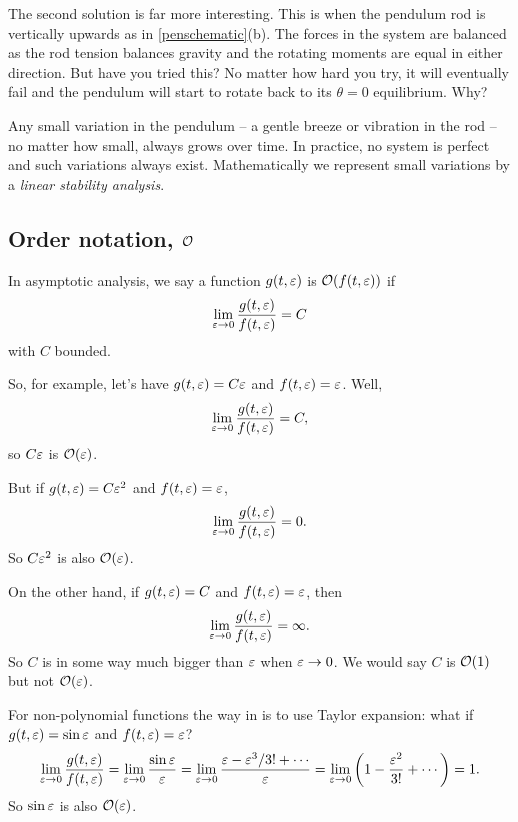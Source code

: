 \documentclass[main.tex]{subfiles}
\begin{document}
The second solution is far more interesting. This is when the pendulum rod is vertically upwards as in \cref{penschematic}(b). The forces in the system are balanced as the rod tension balances gravity and the rotating moments are equal in either direction. But have you tried this? No matter how hard you try, it will eventually fail and the pendulum will start to rotate back to its $\theta=0$ equilibrium. Why? 

Any small variation in the pendulum -- a gentle breeze or vibration in the rod -- no matter how small, always grows over time. In practice, no system is perfect and such variations always exist. Mathematically we represent small variations by a \emph{linear stability analysis}.

\subsection{Order notation, \texorpdfstring{$\mathcal{O}$}{O}}
In asymptotic analysis, we say a function $g(t,\varepsilon)$ is $\mathcal{O}(f(t,\varepsilon))$ if 
\begin{equation}
\lim_{\varepsilon\to 0} \frac{g(t,\varepsilon)}{f(t,\varepsilon)} = C
\end{equation}
with $C$ bounded. 

So, for example, let's have $g(t,\varepsilon) = C \varepsilon$ and $f(t,\varepsilon)  = \varepsilon$. Well,
\begin{equation}
\lim_{\varepsilon\to 0} \frac{g(t,\varepsilon)}{f(t,\varepsilon)} = C,
\end{equation}
so $ C \varepsilon$ is $\mathcal{O}(\varepsilon)$. 

But if $g(t,\varepsilon) = C \varepsilon^2$ and $f(t,\varepsilon)  = \varepsilon$,
\begin{equation}
\lim_{\varepsilon\to 0} \frac{g(t,\varepsilon)}{f(t,\varepsilon)} = 0.
\end{equation}
So $C \varepsilon^2$ is also $\mathcal{O}(\varepsilon)$.

On the other hand, if $g(t,\varepsilon) = C$ and $f(t,\varepsilon)  = \varepsilon$, then
\begin{equation}
\lim_{\varepsilon\to 0} \frac{g(t,\varepsilon)}{f(t,\varepsilon)} = \infty.
\end{equation}
So $C$ is in some way much bigger than $\varepsilon$ when $\varepsilon\to 0$. We would say $C$ is $\mathcal{O}(1)$ but not $\mathcal{O}(\varepsilon)$. 

For non-polynomial functions the way in is to use Taylor expansion: what if $g(t,\varepsilon) = \sin\varepsilon$ and $f(t,\varepsilon) = \varepsilon$?
\begin{equation}
\lim_{\varepsilon\to 0} \frac{g(t,\varepsilon)}{f(t,\varepsilon)} = \lim_{\varepsilon\to 0}\frac{\sin\varepsilon}{\varepsilon} = \lim_{\varepsilon\to 0}\frac{\varepsilon-\varepsilon^3/3!+\cdots}{\varepsilon} = \lim_{\varepsilon\to 0}\left( 1 - \frac{\varepsilon^2}{3!} + \cdots \right) = 1.
\end{equation}
So $\sin\varepsilon$ is also $\mathcal{O}(\varepsilon)$.
\end{document}
